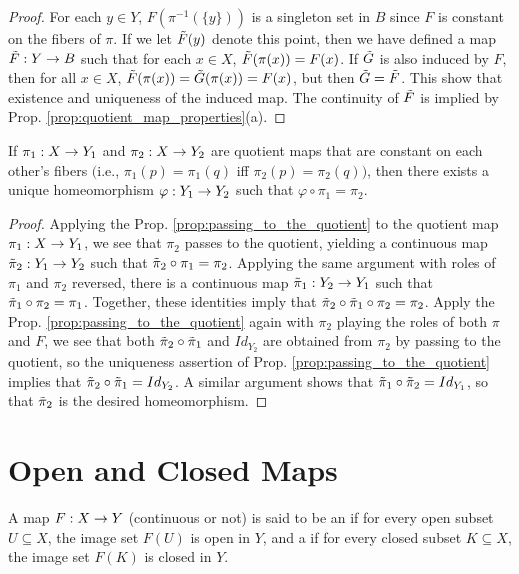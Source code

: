 \documentclass[11pt,a4paper]{article}
\begin{document}
\begin{proof}
For each $y\in Y$, $F(\pi^{-1}(\{y\}))$ is a singleton set in $B$ since $F$ is constant on the fibers of $\pi$. If we let $\Tilde{F}(y)$ denote this point, then we have defined a map $\Tilde{F}:Y\rightarrow B$ such that for each $x\in X$, $\Tilde{F}(\pi(x)) = F(x)$. If $\Tilde{G}$ is also induced by $F$, then for all $x\in X$, $\Tilde{F}(\pi(x)) = \Tilde{G}(\pi(x)) = F(x)$, but then $\Tilde{G} = \Tilde{F}$. This show that existence and uniqueness of the induced map. The continuity of $\Tilde{F}$ is implied by Prop. \ref{prop:quotient_map_properties}(a).
\end{proof}

\begin{prop}
If $\pi_1:X\rightarrow Y_1$ and $\pi_2:X\rightarrow Y_2$ are quotient maps that are constant on each other's fibers $($i.e., $\pi_1(p) = \pi_1(q)$ iff $\pi_2(p) = \pi_2(q))$, then there exists a unique homeomorphism $\varphi:Y_1\rightarrow Y_2$ such that $\varphi\circ\pi_1 = \pi_2$.
\end{prop}

\begin{proof}
Applying the Prop. \ref{prop:passing_to_the_quotient} to the quotient map $\pi_1:X\rightarrow Y_1$, we see that $\pi_2$ passes to the quotient, yielding a continuous map $\Tilde{\pi}_2:Y_1\rightarrow Y_2$ such that $\Tilde{\pi}_2\circ \pi_1 = \pi_2$. Applying the same argument with roles of $\pi_1$ and $\pi_2$ reversed, there is a continuous map $\Tilde{\pi}_1:Y_2\rightarrow Y_1$ such that $\Tilde{\pi}_1\circ\pi_2 = \pi_1$. Together, these identities imply that $\Tilde{\pi}_2\circ\Tilde{\pi}_1\circ\pi_2 = \pi_2$. Apply the Prop. \ref{prop:passing_to_the_quotient} again with $\pi_2$ playing the roles of both $\pi$ and $F$, we see that both $\Tilde{\pi}_2\circ\Tilde{\pi}_1$ and $Id_{Y_2}$ are obtained from $\pi_2$ by passing to the quotient, so the uniqueness assertion of Prop. \ref{prop:passing_to_the_quotient} implies that $\Tilde{\pi}_2\circ\Tilde{\pi}_1 = Id_{Y_2}$. A similar argument shows that $\Tilde{\pi}_1\circ\Tilde{\pi}_2 = Id_{Y_1}$, so that $\Tilde{\pi}_2$ is the desired homeomorphism.
\end{proof}

\section{Open and Closed Maps}

\begin{mydef}
A map $F:X\rightarrow Y$ (continuous or not) is said to be an  if for every open subset $U\subseteq X$, the image set $F(U)$ is open in $Y$, and a  if for every closed subset $K\subseteq X$, the image set $F(K)$ is closed in $Y$. 
\end{mydef}
\end{document}
